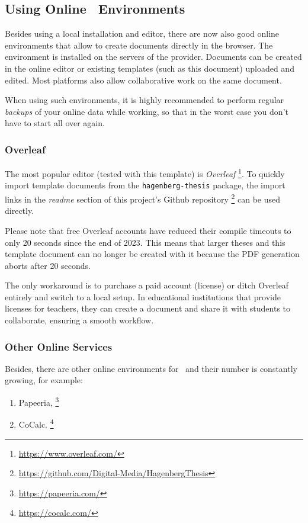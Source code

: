 \subsection{Using Online \latex\ Environments}

Besides using a local \latex installation and editor, there are now also good online 
environments that allow to create \latex documents directly in the browser.
The \latex environment is installed on the servers of the provider. Documents can be
created in the online editor or existing templates (such as this document) uploaded and 
edited. Most platforms also allow collaborative work on the same document.

When using such environments, it is highly recommended to perform regular \emph{backups} of your
online data while working, so that in the worst case you don't have to start all over 
again.

\subsubsection{Overleaf}

The most popular editor (tested with this template) is \emph{Overleaf}%
\footnote{\url{https://www.overleaf.com/}}.
To quickly import template documents from the \texttt{hagenberg-thesis} package, the 
import links in the \emph{readme} section of this project's Github repository%
\footnote{\url{https://github.com/Digital-Media/HagenbergThesis}}
can be used directly.

Please note that free Overleaf accounts have reduced their compile timeouts to only 20 seconds since the end of 2023. This means that larger theses and this template document can no longer be created with it because the PDF generation aborts after 20 seconds.

The only workaround is to purchase a paid account (license) or ditch Overleaf entirely and switch to a local setup. In educational institutions that provide licenses for teachers, they can create a document and share it with students to collaborate, ensuring a smooth workflow.


\subsubsection{Other Online Services}

Besides, there are other online environments for \latex\ and their number is constantly growing, for example:
%
\begin{enumerate}
	\item Papeeria,%
	\footnote{\url{https://papeeria.com/}}
	\item CoCalc.%
	\footnote{\url{https://cocalc.com/}}
\end{enumerate}
